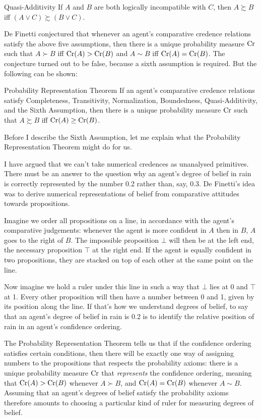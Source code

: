 \begin{genericthm}{Quasi-Additivity}
  If $A$ and $B$ are both logically incompatible with $C$, then $A
  \succsim B$ iff $(A \lor C) \succsim (B \lor C)$.
\end{genericthm}

De Finetti conjectured that whenever an agent's comparative credence
relations satisfy the above five assumptions, then there is a unique
probability measure $\text{Cr}$ such that $A \succ B$ iff $\text{Cr}(A) > \text{Cr}(B)$
and $A \sim B$ iff $\text{Cr}(A) = \text{Cr}(B)$. The conjecture turned out to be
false, because a sixth assumption is required. But the following can
be shown:
%
\begin{genericthm}{Probability Representation Theorem}
  If an agent's comparative credence relations satisfy Completeness,
  Transitivity, Normalization, Boundedness, Quasi-Additivity, and the
  Sixth Assumption, then there is a unique probability measure $\text{Cr}$
  such that $A \succsim B$ iff $\text{Cr}(A) \geq \text{Cr}(B)$.
\end{genericthm}
%
Before I describe the Sixth Assumption, let me explain what the
Probability Representation Theorem might do for us.

I have argued that we can't take numerical credences as unanalysed
primitives. There must be an answer to the question why an agent's
degree of belief in rain is correctly represented by the number 0.2
rather than, say, 0.3. De Finetti's idea was to derive numerical
representations of belief from comparative attitudes towards
propositions.

Imagine we order all propositions on a line, in accordance with the
agent's comparative judgements: whenever the agent is more confident
in $A$ then in $B$, $A$ goes to the right of $B$. The impossible
proposition $\bot$ will then be at the left end, the necessary
proposition $\top$ at the right end. If the agent is equally confident
in two propositions, they are stacked on top of each other at the same
point on the line. 

Now imagine we hold a ruler under this line in such a way that $\bot$
lies at 0 and $\top$ at 1. Every other proposition will then have a
number between 0 and 1, given by its position along the line. If
that's how we understand degrees of belief, to say that an agent's
degree of belief in rain is 0.2 is to identify the relative position
of rain in an agent's confidence ordering.

The Probability Representation Theorem tells us that if the confidence
ordering satisfies certain conditions, then there will be exactly one
way of assigning numbers to the propositions that respects the
probability axioms: there is a unique probability measure $\text{Cr}$ that
\emph{represents} the confidence ordering, meaning that $\text{Cr}(A) >
\text{Cr}(B)$ whenever $A \succ B$, and $\text{Cr}(A) = \text{Cr}(B)$ whenever $A \sim
B$. Assuming that an agent's degrees of belief satisfy the probability
axioms therefore amounts to choosing a particular kind of ruler for
measuring degrees of belief.

